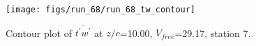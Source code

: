 \begin{figure}[H]
\centering
\texttt{[image: figs/run\_68/run\_68\_tw\_contour]}
\caption{Contour plot of $\overline{t^\prime w^\prime}$ at $z/c$=10.00, $V_{free}$=29.17, station 7.}
\label{fig:run_68_tw_contour}
\end{figure}



